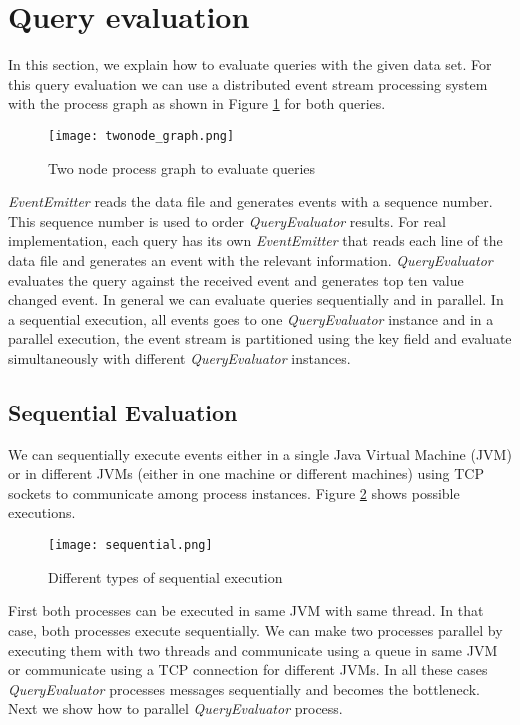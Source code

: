 \section{Query evaluation}

In this section, we explain how to evaluate queries with the given data set. For this query evaluation we can use a distributed event stream processing system with the process graph as shown in Figure \ref{twonode_graph} for both queries.

\begin{figure}[!t]
        \centering
        \texttt{[image: twonode\_graph.png]}
        \caption{Two node process graph to evaluate queries}
        \label{twonode_graph}
\end{figure}

\textit{EventEmitter} reads the data file and generates events with a sequence number. This sequence number is used to order \textit{QueryEvaluator} results. For real implementation, each query has its own \textit{EventEmitter} that reads each line of the data file and generates an event with the relevant information. \textit{QueryEvaluator} evaluates the query against the received event and generates top ten value changed event.  In general we can evaluate queries sequentially and in parallel. In a sequential execution, all events goes to one \textit{QueryEvaluator} instance and in a parallel execution, the event stream is partitioned using the key field and evaluate simultaneously with different \textit{QueryEvaluator} instances.

\subsection{Sequential Evaluation}

We can sequentially execute events either in a single Java Virtual Machine (JVM) or in different JVMs (either in one machine or different machines) using TCP sockets to communicate among process instances. Figure \ref{sequential} shows possible executions. 

\begin{figure}[!t]
        \centering
        \texttt{[image: sequential.png]}
        \caption{Different types of sequential execution}
        \label{sequential}
\end{figure}

First both processes can be executed in same JVM with same thread. In that case, both processes execute sequentially. We can make two processes parallel by executing them with two threads and communicate using a queue in same JVM or communicate using a TCP connection for different JVMs. In all these cases \textit{QueryEvaluator} processes messages sequentially and becomes the bottleneck. Next we show how to parallel \textit{QueryEvaluator} process. 


